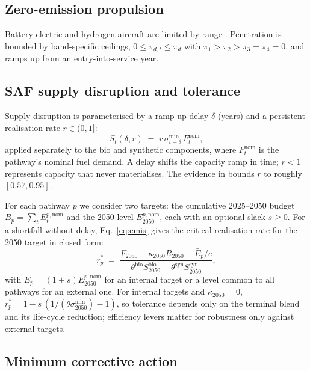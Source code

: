 \documentclass[preprint, 12pt, authoryear]{elsarticle}
\begin{document}
\subsection{Zero-emission propulsion}

Battery-electric and hydrogen aircraft are limited by range
\citep{akinola2025, uddin2025}. Penetration is bounded by band-specific ceilings,
$0\le\pi_{d,t}\le\bar\pi_d$ with $\bar\pi_1>\bar\pi_2>\bar\pi_3=\bar\pi_4=0$,
and ramps up from an entry-into-service year.

\subsection{SAF supply disruption and tolerance}
\label{sec:stressmodel}

Supply disruption is parameterised by a ramp-up delay $\delta$ (years) and a
persistent realisation rate $r\in(0,1]$:
\begin{equation}
\label{eq:disrupt}
S_t(\delta, r) \;=\; r\,\sigma^{\min}_{t-\delta}\, F^{\mathrm{nom}}_t,
\end{equation}
applied separately to the bio and synthetic components, where
$F^{\mathrm{nom}}_t$ is the pathway's nominal fuel demand. A delay shifts the
capacity ramp in time; $r<1$ represents capacity that never materialises. The
evidence in \citet{martulli2025} bounds $r$ to roughly $[0.57, 0.95]$.

For each pathway $p$ we consider two targets: the cumulative 2025--2050 budget
$B_p=\sum_t E^{p,\mathrm{nom}}_t$ and the 2050 level $E^{p,\mathrm{nom}}_{2050}$,
each with an optional slack $s\ge 0$. For a shortfall without delay,
Eq.~\eqref{eq:emis} gives the critical realisation rate for the 2050 target in
closed form:
\begin{equation}
\label{eq:rstar}
r^{*}_p \;=\; \frac{F_{2050} + \kappa_{2050}R_{2050} - \bar E_p/e}
{\theta^{\mathrm{bio}}S^{\mathrm{bio}}_{2050} + \theta^{\mathrm{syn}}S^{\mathrm{syn}}_{2050}},
\end{equation}
with $\bar E_p=(1+s)E^{p,\mathrm{nom}}_{2050}$ for an internal target or a level
common to all pathways for an external one. For internal targets and
$\kappa_{2050}=0$, $r^*_p = 1 - s\,(1/(\bar\theta\sigma^{\min}_{2050})-1)$, so
tolerance depends only on the terminal blend and its life-cycle reduction;
efficiency levers matter for robustness only against external targets.

\subsection{Minimum corrective action}
\label{sec:lpmodel}
\end{document}
